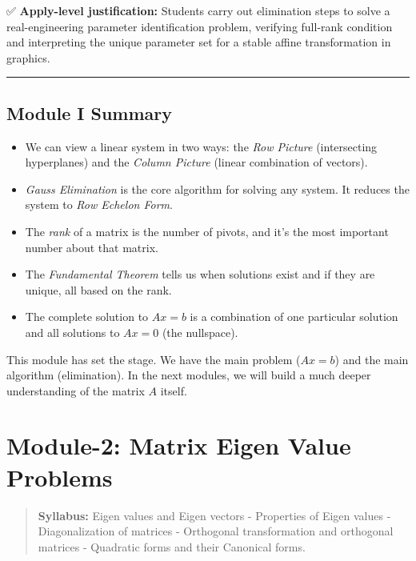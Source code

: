 \documentclass[
  letterpaper,
  DIV=11,
  numbers=noendperiod]{scrreprt}
\providecommand{\tightlist}{%
  \setlength{\itemsep}{0pt}\setlength{\parskip}{0pt}}
\begin{document}
✅ \textbf{Apply-level justification:} Students carry out elimination
steps to solve a real-engineering parameter identification problem,
verifying full-rank condition and interpreting the unique parameter set
for a stable affine transformation in graphics.

\begin{center}\rule{0.5\linewidth}{0.5pt}\end{center}

\section{Module I Summary}\label{module-i-summary}

\begin{itemize}
\tightlist
\item
  We can view a linear system in two ways: the \emph{Row Picture}
  (intersecting hyperplanes) and the \emph{Column Picture} (linear
  combination of vectors).
\item
  \emph{Gauss Elimination} is the core algorithm for solving any system.
  It reduces the system to \emph{Row Echelon Form}.
\item
  The \emph{rank} of a matrix is the number of pivots, and it's the most
  important number about that matrix.
\item
  The \emph{Fundamental Theorem} tells us when solutions exist and if
  they are unique, all based on the rank.
\item
  The complete solution to \(Ax = b\) is a combination of one particular
  solution and all solutions to \(Ax = 0\) (the nullspace).
\end{itemize}

This module has set the stage. We have the main problem (\(Ax=b\)) and
the main algorithm (elimination). In the next modules, we will build a
much deeper understanding of the matrix \(A\) itself.


\chapter{Module-2: Matrix Eigen Value
Problems}\label{module-2-matrix-eigen-value-problems}

\begin{quote}
\textbf{Syllabus:} Eigen values and Eigen vectors - Properties of Eigen
values - Diagonalization of matrices - Orthogonal transformation and
orthogonal matrices - Quadratic forms and their Canonical forms.
\end{quote}
\end{document}
